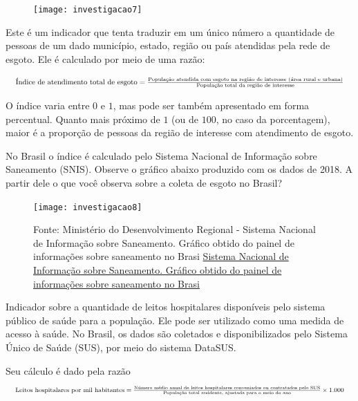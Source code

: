 \begin{figure}[H]
\centering

\texttt{[image: investigacao7]}
\end{figure}


Este é um indicador que tenta traduzir em um único número a quantidade de pessoas de um dado município, estado, região ou país atendidas pela rede de esgoto. Ele é calculado por meio de uma razão:


\begin{equation*}
\resizebox{\hsize}{!}{
$
\text{Índice de atendimento total de esgoto}=\frac
{\text{População atendida com esgoto na região de interesse (área rural e urbana)}}
{\text{População total da região de interesse}}
$
}
\end{equation*}


O índice varia entre $0$ e $1$, mas pode ser também apresentado em forma percentual. Quanto mais próximo de $1$ (ou de $100$, no caso da porcentagem), maior é a proporção de pessoas da região de interesse com atendimento de esgoto.

No Brasil o índice é calculado pelo Sistema Nacional de Informação sobre Saneamento (SNIS). Observe o gráfico abaixo produzido com os dados de 2018. A partir dele o que você observa sobre a coleta de esgoto no Brasil?



\begin{figure}[H]
\centering

\texttt{[image: investigacao8]}

\caption{Fonte: Ministério do Desenvolvimento Regional - Sistema Nacional de Informação sobre Saneamento. Gráfico obtido do painel de informações sobre saneamento no Brasi \href{http://www.snis.gov.br/painel-informacoes-saneamento-brasil/web/painel-esgotamento-sanitario}{Sistema Nacional de Informação sobre Saneamento. Gráfico obtido do painel de informações sobre saneamento no Brasi}}
\end{figure}


Indicador sobre a quantidade de leitos hospitalares disponíveis pelo sistema público de saúde para a população. Ele pode ser utilizado como uma medida de acesso à saúde. No Brasil, os dados são coletados e disponibilizados pelo Sistema Único de Saúde (SUS), por meio do sistema DataSUS. 

Seu cálculo é dado pela razão
\begin{equation*}
\resizebox{\hsize}{!}{
$
\text{Leitos hospitalares por mil habitantes}=\frac
{\text{Número médio anual de leitos hospitalares conveniados ou contratados pelo SUS}}
{\text{População total residente, ajustada para o meio do ano}}\times1.000
$
}
\end{equation*}

